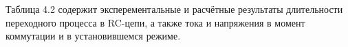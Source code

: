 Таблица 4.2 содержит эксперементальные и расчётные результаты длительности переходного процесса в RC-цепи, а также тока и напряжения в момент коммутации и в установившемся режиме.

\begin{table}[h]
	\centering
	\caption{Результаты измерений и расчётов для RC-цепи}
\end{table}
